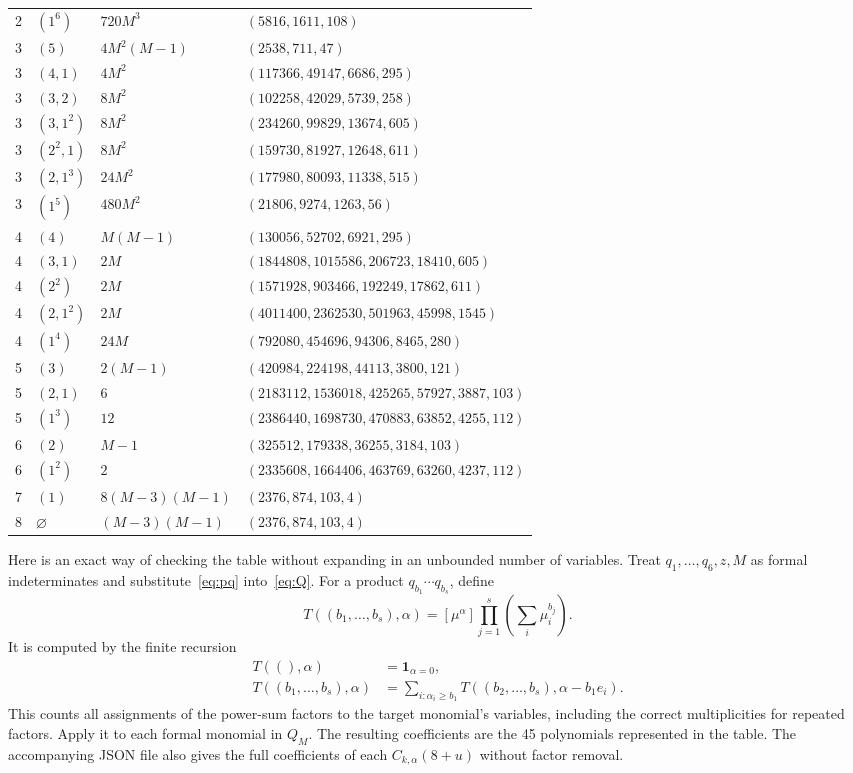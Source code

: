 \documentclass[11pt,a4paper]{article}
\theoremstyle{remark}
\begin{document}
\begin{longtable}{@{}rlll@{}}
2 & $(1^{6})$ & $720 M^{3}$ & $(5816,1611,108)$\\
3 & $(5)$ & $4 M^{2} \left(M - 1\right)$ & $(2538,711,47)$\\
3 & $(4,1)$ & $4 M^{2}$ & $(117366,49147,6686,295)$\\
3 & $(3,2)$ & $8 M^{2}$ & $(102258,42029,5739,258)$\\
3 & $(3,1^{2})$ & $8 M^{2}$ & $(234260,99829,13674,605)$\\
3 & $(2^{2},1)$ & $8 M^{2}$ & $(159730,81927,12648,611)$\\
3 & $(2,1^{3})$ & $24 M^{2}$ & $(177980,80093,11338,515)$\\
3 & $(1^{5})$ & $480 M^{2}$ & $(21806,9274,1263,56)$\\
4 & $(4)$ & $M \left(M - 1\right)$ & $(130056,52702,6921,295)$\\
4 & $(3,1)$ & $2 M$ & $(1844808,1015586,206723,18410,605)$\\
4 & $(2^{2})$ & $2 M$ & $(1571928,903466,192249,17862,611)$\\
4 & $(2,1^{2})$ & $2 M$ & $(4011400,2362530,501963,45998,1545)$\\
4 & $(1^{4})$ & $24 M$ & $(792080,454696,94306,8465,280)$\\
5 & $(3)$ & $2 \left(M - 1\right)$ & $(420984,224198,44113,3800,121)$\\
5 & $(2,1)$ & $6$ & $(2183112,1536018,425265,57927,3887,103)$\\
5 & $(1^{3})$ & $12$ & $(2386440,1698730,470883,63852,4255,112)$\\
6 & $(2)$ & $M - 1$ & $(325512,179338,36255,3184,103)$\\
6 & $(1^{2})$ & $2$ & $(2335608,1664406,463769,63260,4237,112)$\\
7 & $(1)$ & $8 \left(M - 3\right) \left(M - 1\right)$ & $(2376,874,103,4)$\\
8 & $\varnothing$ & $\left(M - 3\right) \left(M - 1\right)$ & $(2376,874,103,4)$\\
\end{longtable}
\endgroup

Here is an exact way of checking the table without expanding in an unbounded number of variables. Treat $q_1,\ldots,q_6,z,M$ as formal indeterminates and substitute~\eqref{eq:pq} into~\eqref{eq:Q}. For a product $q_{b_1}\cdots q_{b_s}$, define
\[
 T((b_1,\ldots,b_s),\alpha)
 =[\mu^\alpha]\prod_{j=1}^s\left(\sum_i\mu_i^{b_j}\right).
\]
It is computed by the finite recursion
\begin{align*}
 T((),\alpha)&=\mathbf1_{\alpha=0},\\
 T((b_1,\ldots,b_s),\alpha)
 &=\sum_{i:\alpha_i\ge b_1}
 T((b_2,\ldots,b_s),\alpha-b_1e_i).
\end{align*}
This counts all assignments of the power-sum factors to the target monomial's variables, including the correct multiplicities for repeated factors. Apply it to each formal monomial in $Q_M$. The resulting coefficients are the 45 polynomials represented in the table. The accompanying JSON file also gives the full coefficients of each $C_{k,\alpha}(8+u)$ without factor removal.
\end{document}
